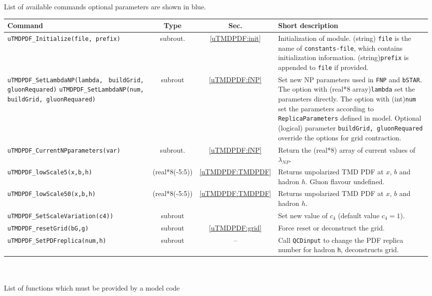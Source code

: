 \documentclass[prd,nofootinbib,eqsecnum,final]{revtex4}
\renewcommand{\(}{\left(}
\renewcommand{\)}{\right)}
\renewcommand{\[}{\left[}
\renewcommand{\]}{\right]}
\newcommand{\blue}[1]{{\color{blue} #1}}
\begin{document}
\begin{center}
List of available commands \blue{optional parameters are shown in blue.}
\\
\begin{tabular}{||p{5.5cm}||c|c||p{8.5cm}||}
\hline\hline
Command &~~Type~~& ~~Sec.~~ & Short description
\\\hline
\texttt{uTMDPDF{\_}Initialize(file,\blue{prefix}) } & subrout. &\ref{uTMDPDF:init} & Initialization of module. (string) \texttt{file} is the name of \texttt{constants-file}, which contains initialization information. (string)\texttt{prefix} is appended to \texttt{file} if provided.
\\\hline
\texttt{uTMDPDF{\_}SetLambdaNP(lambda,} \texttt{\blue{buildGrid, gluonRequared})}
\texttt{uTMDPDF{\_}SetLambdaNP(num,} \texttt{\blue{buildGrid, gluonRequared})}
& subrout & \ref{uTMDPDF:fNP}& Set new NP parameters used in \texttt{FNP} and \texttt{bSTAR}. The option with (real*8 array)\texttt{lambda} set the parameters directly. The option with (int)\texttt{num} set the parameters according to \texttt{ReplicaParameters} defined in model. Optional (logical) parameter \texttt{buildGrid, gluonRequared} override the options for grid contraction.
\\\hline
\texttt{uTMDPDF\_CurrentNPparameters(var)} & subrout. &\ref{uTMDPDF:fNP} & Return the (real*8) array of current values of $\lambda_{NP}$.
\\\hline
\texttt{uTMDPDF{\_}lowScale5(x,b,h)} &(real*8(-5:5)) & \ref{uTMDPDF:TMDPDF} & Returns unpolarized TMD PDF at $x$, $b$ and hadron $h$. Gluon flavour undefined.
\\\hline
\texttt{uTMDPDF{\_}lowScale50(x,b,h)} &(real*8(-5:5)) & \ref{uTMDPDF:TMDPDF}&  Returns unpolarized TMD PDF at $x$, $b$ and hadron $h$.
\\\hline
\texttt{uTMDPDF{\_}SetScaleVariation(c4))}& subrout &  & Set new value of $c_4$ (default value $c_4=1$).
\\\hline
\texttt{uTMDPDF{\_}resetGrid(bG,g)}& subrout & \ref{uTMDPDF:grid}& Force reset or deconstruct the grid.
\\\hline
\texttt{uTMDPDF{\_}SetPDFreplica(num,h)}& subrout & -- & Call \texttt{QCDinput} to change the PDF replica number for hadron \texttt{h}, deconstructs grid.
\\
\hline\hline
\end{tabular}
\\
~
\\
List of functions which must be provided by a model code
\\

\end{center}
\end{document}

